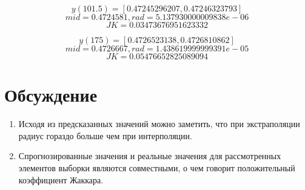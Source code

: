 \documentclass[a4paper,12pt]{article}
\begin{document}
$$y(101.5) = [0.47245296207, 0.47246323793]$$
$$mid = 0.4724581, rad = 5.137930000009838e-06$$
$$JK = 0.03473676951623332$$


$$y(175) = [0.4726523138, 0.4726810862]$$
$$mid = 0.4726667, rad = 1.438619999999391e-05$$
$$JK = 0.05476652825089094$$

\section{Обсуждение}
\begin{enumerate}
    \item Исходя из предсказанных значений можно заметить, что при экстраполяции радиус гораздо больше чем при интерполяции.
    \item Спрогнозированные значения и реальные значения для рассмотренных элементов выборки являются совместными, о чем говорит положительный коэффициент Жаккара.
\end{enumerate}
\end{document}

